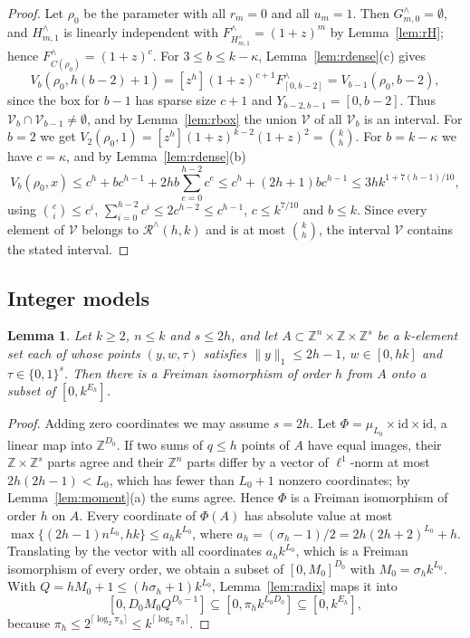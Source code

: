 \documentclass[11pt]{amsart}
\newtheorem{lemma}[theorem]{Lemma}
\theoremstyle{definition}
\theoremstyle{remark}
\numberwithin{equation}{section}
\newcommand{\Z}{\mathbb{Z}}
\newcommand{\Rr}{\mathcal{R}^{\wedge}}
\newcommand{\Fr}{F^{\wedge}}
\newcommand{\coef}[1]{[z^{#1}]}
\begin{document}
\begin{proof}
Let $\rho_0$ be the parameter with all $r_m=0$ and all $u_m=1$. Then $G^\wedge_{m,0}=\emptyset$, and $H^\wedge_{m,1}$ is linearly independent with $\Fr_{H^\wedge_{m,1}}=(1+z)^m$ by Lemma~\ref{lem:rH}; hence $\Fr_{C(\rho_0)}=(1+z)^c$. For $3\le b\le k-\kappa$, Lemma~\ref{lem:rdense}(c) gives
\[
V_b(\rho_0,h(b-2)+1)=\coef h(1+z)^{c+1}\Fr_{[0,b-2]}=V_{b-1}(\rho_0,b-2),
\]
since the box for $b-1$ has sparse size $c+1$ and $Y_{b-2,b-1}=[0,b-2]$. Thus $\mathcal V_b\cap\mathcal V_{b-1}\neq\emptyset$, and by Lemma~\ref{lem:rbox} the union $\mathcal V$ of all $\mathcal V_b$ is an interval. For $b=2$ we get $V_2(\rho_0,1)=\coef h(1+z)^{k-2}(1+z)^2=\binom kh$. For $b=k-\kappa$ we have $c=\kappa$, and by Lemma~\ref{lem:rdense}(b)
\[
V_b(\rho_0,x)\le c^h+bc^{h-1}+2hb\sum_{e=0}^{h-2}c^e\le c^h+(2h+1)bc^{h-1}\le 3hk^{1+7(h-1)/10},
\]
using $\binom ci\le c^i$, $\sum_{i=0}^{h-2}c^i\le 2c^{h-2}\le c^{h-1}$, $c\le k^{7/10}$ and $b\le k$. Since every element of $\mathcal V$ belongs to $\Rr(h,k)$ and is at most $\binom kh$, the interval $\mathcal V$ contains the stated interval.
\end{proof}

\subsection{Integer models}

\begin{lemma}\label{lem:rmodel}
Let $k\ge 2$, $n\le k$ and $s\le 2h$, and let $A\subset\Z^n\times\Z\times\Z^s$ be a $k$-element set each of whose points $(y,w,\tau)$ satisfies $\|y\|_1\le 2h-1$, $w\in[0,hk]$ and $\tau\in\{0,1\}^s$. Then there is a Freiman isomorphism of order $h$ from $A$ onto a subset of $[0,k^{E_h}]$.
\end{lemma}

\begin{proof}
Adding zero coordinates we may assume $s=2h$. Let $\Phi=\mu_{L_0}\times\mathrm{id}\times\mathrm{id}$, a linear map into $\Z^{D_0}$. If two sums of $q\le h$ points of $A$ have equal images, their $\Z\times\Z^s$ parts agree and their $\Z^n$ parts differ by a vector of $\ell^1$-norm at most $2h(2h-1)<L_0$, which has fewer than $L_0+1$ nonzero coordinates; by Lemma~\ref{lem:moment}(a) the sums agree. Hence $\Phi$ is a Freiman isomorphism of order $h$ on $A$. Every coordinate of $\Phi(A)$ has absolute value at most $\max\{(2h-1)n^{L_0},hk\}\le a_hk^{L_0}$, where $a_h=(\sigma_h-1)/2=2h(2h+2)^{L_0}+h$. Translating by the vector with all coordinates $a_hk^{L_0}$, which is a Freiman isomorphism of every order, we obtain a subset of $[0,M_0]^{D_0}$ with $M_0=\sigma_hk^{L_0}$. With $Q=hM_0+1\le(h\sigma_h+1)k^{L_0}$, Lemma~\ref{lem:radix} maps it into
\[
[0,D_0M_0Q^{D_0-1}]\subseteq[0,\pi_hk^{L_0D_0}]\subseteq[0,k^{E_h}],
\]
because $\pi_h\le 2^{\lceil\log_2\pi_h\rceil}\le k^{\lceil\log_2\pi_h\rceil}$.
\end{proof}
\end{document}
